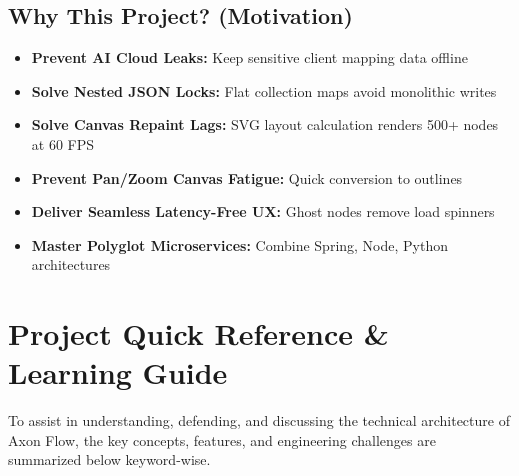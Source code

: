 \documentclass[12pt, a4paper]{article}
\begin{document}
\subsection{Why This Project? (Motivation)}
\begin{itemize}[label=\small$\bullet$, leftmargin=15pt, nosep]
  \item \textbf{Prevent AI Cloud Leaks:} Keep sensitive client mapping data offline
  \item \textbf{Solve Nested JSON Locks:} Flat collection maps avoid monolithic writes
  \item \textbf{Solve Canvas Repaint Lags:} SVG layout calculation renders 500+ nodes at 60 FPS
  \item \textbf{Prevent Pan/Zoom Canvas Fatigue:} Quick conversion to outlines
  \item \textbf{Deliver Seamless Latency-Free UX:} Ghost nodes remove load spinners
  \item \textbf{Master Polyglot Microservices:} Combine Spring, Node, Python architectures
\end{itemize}

\newpage
\section{Project Quick Reference \& Learning Guide}

To assist in understanding, defending, and discussing the technical architecture of Axon Flow, the key concepts, features, and engineering challenges are summarized below keyword-wise.
\end{document}
